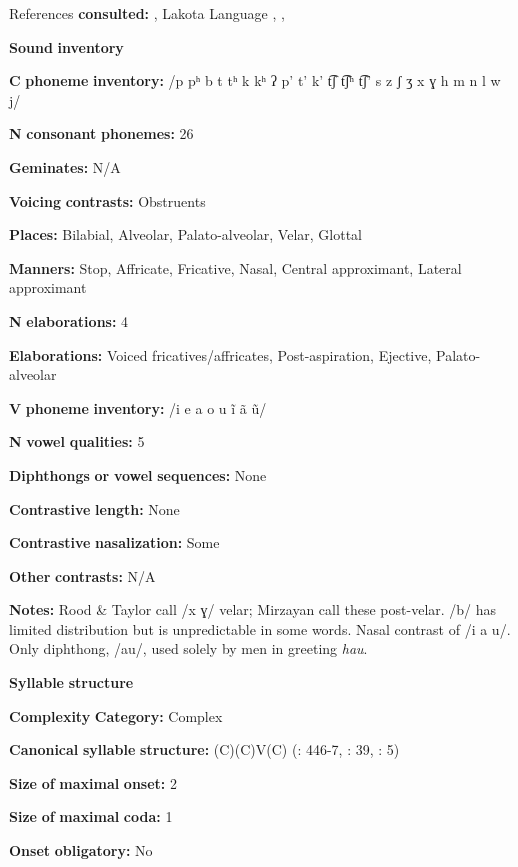 \begin{styleBody}
References \textbf{consulted:} \citet{Ingham2003}, Lakota Language \citet{Consortium2008}, \citet{Mirzayan2010}, \citet{RoodTaylor1996}

\textbf{Sound} \textbf{inventory}

\textbf{C} \textbf{phoneme} \textbf{inventory:} /p pʰ b t tʰ k kʰ ʔ p’ t’ k’ t͡ʃ t͡ʃʰ t͡ʃ’ s z ʃ ʒ x ɣ h m n l w j/

\textbf{N} \textbf{consonant} \textbf{phonemes:} 26

\textbf{Geminates:} N/A

\textbf{Voicing} \textbf{contrasts:} Obstruents

\textbf{Places:} Bilabial, Alveolar, Palato-alveolar, Velar, Glottal

\textbf{Manners:} Stop, Affricate, Fricative, Nasal, Central approximant, Lateral approximant

\textbf{N} \textbf{elaborations:} 4

\textbf{Elaborations:} Voiced fricatives/affricates, Post-aspiration, Ejective, Palato-alveolar

\textbf{V} \textbf{phoneme} \textbf{inventory:} /i e a o u ĩ ã ũ/

\textbf{N} \textbf{vowel} \textbf{qualities:} 5

\textbf{Diphthongs} \textbf{or} \textbf{vowel} \textbf{sequences:} None

\textbf{Contrastive} \textbf{length:} None

\textbf{Contrastive} \textbf{nasalization:} Some

\textbf{Other} \textbf{contrasts:} N/A

\textbf{Notes:} Rood \& Taylor call /x ɣ/ velar; Mirzayan call these post-velar. /b/ has limited distribution but is unpredictable in some words. Nasal contrast of /i a u/. Only diphthong, /au/, used solely by men in greeting \textit{hau}.

\textbf{Syllable} \textbf{structure}

\textbf{Complexity} \textbf{Category:} Complex

\textbf{Canonical} \textbf{syllable} \textbf{structure:} (C)(C)V(C) (\citealt{RoodTaylor1996}: 446-7, \citealt{Mirzayan2010}: 39, \citealt{Ingham2003}: 5)

\textbf{Size} \textbf{of} \textbf{maximal} \textbf{onset:} 2

\textbf{Size} \textbf{of} \textbf{maximal} \textbf{coda:} 1

\textbf{Onset} \textbf{obligatory:} No


\end{styleBody}
